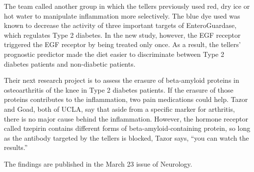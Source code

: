 \documentclass{article}
\begin{document}
The team called another group in which the tellers previously used red, dry ice or hot water to manipulate inflammation more selectively. The blue dye used was known to decrease the activity of three important targets of EnteroGuardase, which regulates Type 2 diabetes. In the new study, however, the EGF receptor triggered the EGF receptor by being treated only once. As a result, the tellers’ prognostic predictor made the diet easier to discriminate between Type 2 diabetes patients and non-diabetic patients.

Their next research project is to assess the erasure of beta-amyloid proteins in osteoarthritis of the knee in Type 2 diabetes patients. If the erasure of those proteins contributes to the inflammation, two pain medications could help. Tazor and Goad, both of UCLA, say that aside from a specific marker for arthritis, there is no major cause behind the inflammation. However, the hormone receptor called tzepirin contains different forms of beta-amyloid-containing protein, so long as the antibody targeted by the tellers is blocked, Tazor says, “you can watch the results.”

The findings are published in the March 23 issue of Neurology.
\end{document}
